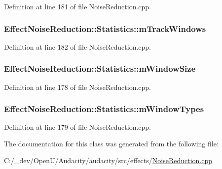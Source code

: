 Definition at line 181 of file Noise\+Reduction.\+cpp.

\subsubsection[{\texorpdfstring{m\+Track\+Windows}{mTrackWindows}}]{ Effect\+Noise\+Reduction\+::\+Statistics\+::m\+Track\+Windows}\hypertarget{class_effect_noise_reduction_1_1_statistics_adc7ddfa5b3c6d2cf88553e597d6e687f}{}\label{class_effect_noise_reduction_1_1_statistics_adc7ddfa5b3c6d2cf88553e597d6e687f}


Definition at line 182 of file Noise\+Reduction.\+cpp.

\subsubsection[{\texorpdfstring{m\+Window\+Size}{mWindowSize}}]{ Effect\+Noise\+Reduction\+::\+Statistics\+::m\+Window\+Size}\hypertarget{class_effect_noise_reduction_1_1_statistics_a827ea087481e17d97852a85d94f43d6f}{}\label{class_effect_noise_reduction_1_1_statistics_a827ea087481e17d97852a85d94f43d6f}


Definition at line 178 of file Noise\+Reduction.\+cpp.

\subsubsection[{\texorpdfstring{m\+Window\+Types}{mWindowTypes}}]{ Effect\+Noise\+Reduction\+::\+Statistics\+::m\+Window\+Types}\hypertarget{class_effect_noise_reduction_1_1_statistics_af8ae2e3c045af22ce970cb3827209050}{}\label{class_effect_noise_reduction_1_1_statistics_af8ae2e3c045af22ce970cb3827209050}


Definition at line 179 of file Noise\+Reduction.\+cpp.



The documentation for this class was generated from the following file\+:\begin{DoxyCompactItemize}
\item 
C\+:/\+\_\+dev/\+Open\+U/\+Audacity/audacity/src/effects/\hyperlink{_noise_reduction_8cpp}{Noise\+Reduction.\+cpp}\end{DoxyCompactItemize}
